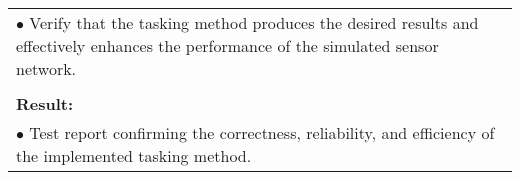 \begin{table}[!h]
\begin{center}
\begin{tabular}{|p{35mm}||p{55mm}|p{50mm}||p{40mm}|}
      \multicolumn{4}{|p{150mm}|}{$\bullet$ Verify that the tasking method produces the desired results and effectively enhances the performance of the simulated sensor network.} \\
      \multicolumn{4}{|p{150mm}|}{}                                                                                                                                                                           \\
      \multicolumn{4}{|p{150mm}|}{\textbf{Result:}}                                                                                                                                                       \\
      \multicolumn{4}{|p{150mm}|}{$\bullet$ Test report confirming the correctness, reliability, and efficiency of the implemented tasking method.}                                                                                                                          \\
      \hline
    \end{tabular}
  \end{center}
\end{table}

\clearpage

